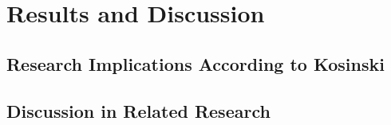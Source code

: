 \section{Results and Discussion}
\subsection{Research Implications According to Kosinski}

\subsection{Discussion in Related Research}